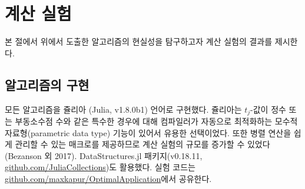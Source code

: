\documentclass[11pt]{article} %
\newif\ifen
\theoremstyle{definition}
\theoremstyle{definition}
\begin{document}




\ifen \section{Numerical experiments} \else \section{계산 실험}\fi\label{numericalexperiments}
\ifen
In this section, we present the results of numerical experiments designed to test the practical efficacy of the algorithms derived above. 
\else
본 절에서 위에서 도출한 알고리즘의 현실성을 탐구하고자 계산 실험의 결과를 제시한다.
\fi

\ifen \subsection{Implementation notes} \else \subsection{알고리즘의 구현}\fi
\ifen
We chose to implement our algorithms in the Julia language (v1.8.0b1) because its system of parametric data types allows the compiler to optimize for differential cases such as when the $t_j$-values are integers or floating-point numbers. Julia also offers convenient macros for parallel computing, which enabled us to solve more and larger problems in the benchmark (Bezanson et al. 2017). We made extensive use of the DataStructures.jl package (v0.18.11, \url{github.com/JuliaCollections}). The code is available at \url{github.com/maxkapur/OptimalApplication}.
\else
모든 알고리즘을 쥴리아 (Julia, v1.8.0b1) 언어로 구현했다. 쥴리아는 $t_j$-값이 정수 또는 부동소수점 수와 같은 특수한 경우에 대해 컴파일러가 자동으로 최적화하는 모수적 자료형(parametric data type) 기능이 있어서 유용한 선택이었다. 또한 병렬 연산을 쉽게 관리할 수 있는 매크로를 제공하므로 계산 실험의 규모를 증가할 수 있었다 (Bezanson 외 2017). DataStructures.jl 패키지(v0.18.11, \url{github.com/JuliaCollections})도 활용했다. 실험 코드는  \url{github.com/maxkapur/OptimalApplication}에서 공유한다.
\fi
\end{document}
